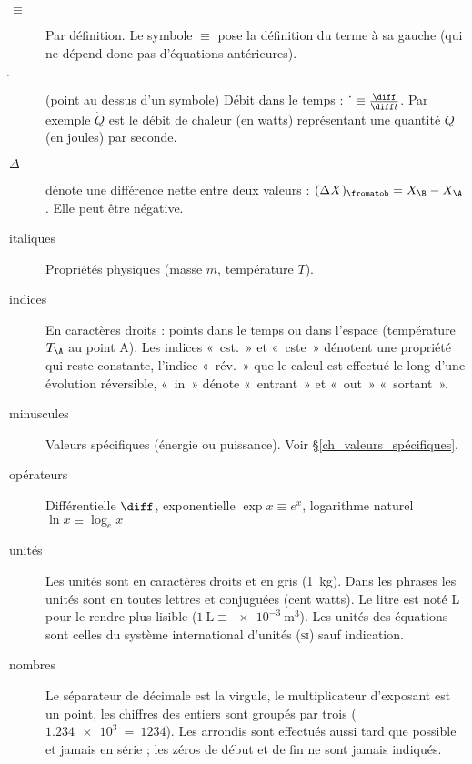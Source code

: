 
\TabPositions{2cm}
\begin{description}
	\item[$\equiv$] 	\tab Par définition. Le symbole $\equiv$ pose la définition du terme à sa gauche (qui ne dépend donc pas d’équations antérieures).
	\item[$\dot~$]		\tab (point au dessus d’un symbole) Débit dans le temps : $\dot~ \equiv \frac{\diff}{\diff t}$. Par exemple $\dot Q$ est le débit de chaleur (en \si{watts}) représentant une quantité $Q$ (en \si{joules}) par \si{seconde}.
	\item[$\Delta$]	\tab dénote une différence nette entre deux valeurs : $(\Delta X)_\fromatob = X_\B - X_\A$. Elle peut être négative.
	\item[italiques] 	Propriétés physiques (masse $m$, température $T$).
	\item[indices]		En caractères droits : points dans le temps ou dans l’espace (température $T_\A$ au point A). Les indices «~cst.~» et «~cste~» dénotent une propriété qui reste constante, l’indice «~rév.~» que le calcul est effectué le long d’une évolution réversible, «~in~» dénote «~entrant~» et «~out~» «~sortant~».
	\item[minuscules]	Valeurs spécifiques (énergie ou puissance). Voir \S\ref{ch_valeurs_spécifiques}.
	\item[opérateurs]	Différentielle $\diff$, exponentielle $\exp x \equiv e^x $, logarithme naturel $\ln x \equiv \log_e x$
	\item[unités]		Les unités sont en caractères droits et en gris (\SI{1}{\kilogram}). Dans les phrases les unités sont en toutes lettres et conjuguées (cent \si{watts}). Le \si{litre} est noté \si{\liter} pour le rendre plus lisible ($\SI{1}{\liter} \equiv \SI{e-3}{\metre\cubed}$). Les unités des équations sont celles du système international d’unités (\textsc{si}) sauf indication.
	\item[nombres]		Le séparateur de décimale est la virgule, le multiplicateur d’exposant est un point, les chiffres des entiers sont groupés par trois ($\SI{1,234e3} ~=~ \num{1234}$). Les arrondis sont effectués aussi tard que possible et jamais en série ; les zéros de début et de fin ne sont jamais indiqués.
\end{description}
